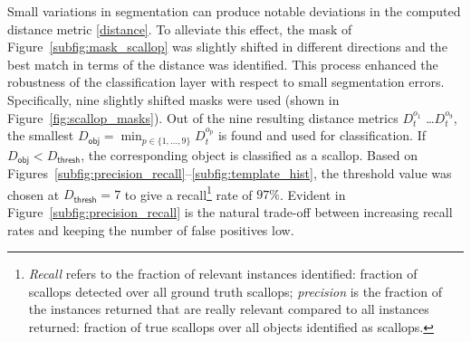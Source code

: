 \documentclass {udthesis}
\begin{document}
Small variations in segmentation can produce notable deviations in the computed distance metric \eqref{distance}.
To alleviate this effect, the mask of Figure~\ref{subfig:mask_scallop} was slightly shifted in different directions and the best match in terms of the distance was identified.
This process enhanced the robustness of the classification layer with respect to  small segmentation errors.
Specifically, nine slightly shifted masks were used (shown in
Figure~\ref{fig:scallop_masks}).  Out of the nine resulting
distance metrics $D^{o_1}_t$ \ldots $D^{o_9}_t$, the smallest $
 D_\mathsf{obj}=\min_{p\in\{1,\ldots,9\}} D^{o_p}_t
$ is found and used for classification. 
If $D_\mathsf{obj}<D_\mathsf{thresh}$, 
the corresponding object
is classified as a scallop.
Based on Figures~\ref{subfig:precision_recall}--\ref{subfig:template_hist},
the threshold value was chosen at $D_\mathsf{thresh}=7$ to give a recall\footnote{\emph{Recall} refers to the fraction of relevant instances
identified: fraction of scallops detected over all ground truth scallops;
\emph{precision} is the fraction of the instances returned that are really relevant
compared to all instances returned: fraction of true scallops over all objects
identified as scallops.} rate of 
$97\%$.
Evident in Figure~\ref{subfig:precision_recall} is the natural trade-off between increasing recall rates and keeping the number of false positives low.
\end{document}
